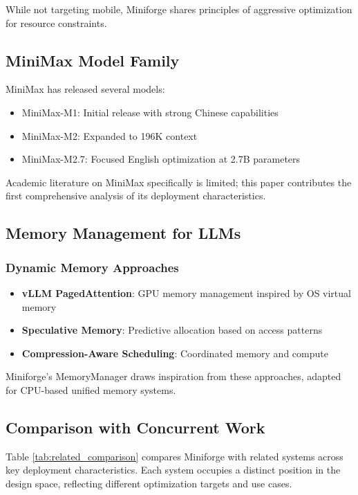 While not targeting mobile, Miniforge shares principles of aggressive optimization for resource constraints.

\subsection{MiniMax Model Family}

MiniMax has released several models:

\begin{itemize}
    \item MiniMax-M1: Initial release with strong Chinese capabilities
    \item MiniMax-M2: Expanded to 196K context
    \item MiniMax-M2.7: Focused English optimization at 2.7B parameters
\end{itemize}

Academic literature on MiniMax specifically is limited; this paper contributes the first comprehensive analysis of its deployment characteristics.

\subsection{Memory Management for LLMs}

\subsubsection{Dynamic Memory Approaches}

\begin{itemize}
    \item \textbf{vLLM PagedAttention}: GPU memory management inspired by OS virtual memory
    \item \textbf{Speculative Memory}: Predictive allocation based on access patterns
    \item \textbf{Compression-Aware Scheduling}: Coordinated memory and compute
\end{itemize}

Miniforge's MemoryManager draws inspiration from these approaches, adapted for CPU-based unified memory systems.

\subsection{Comparison with Concurrent Work}

Table \ref{tab:related_comparison} compares Miniforge with related systems across key deployment characteristics. Each system occupies a distinct position in the design space, reflecting different optimization targets and use cases.

